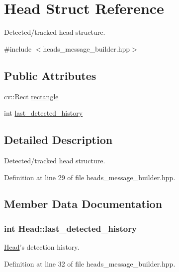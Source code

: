 \hypertarget{struct_head}{\section{\-Head \-Struct \-Reference}
\label{struct_head}
}


\-Detected/tracked head structure.  




{\ttfamily \#include $<$heads\-\_\-message\-\_\-builder.\-hpp$>$}

\subsection*{\-Public \-Attributes}
\begin{DoxyCompactItemize}
\item 
cv\-::\-Rect \hyperlink{struct_head_abab8dfa974c091d1af36c7182e8d1ae2}{rectangle}
\item 
int \hyperlink{struct_head_aa15cb7de63f5d769d5a39356d04f0636}{last\-\_\-detected\-\_\-history}
\end{DoxyCompactItemize}


\subsection{\-Detailed \-Description}
\-Detected/tracked head structure. 

\-Definition at line 29 of file heads\-\_\-message\-\_\-builder.\-hpp.



\subsection{\-Member \-Data \-Documentation}
\hypertarget{struct_head_aa15cb7de63f5d769d5a39356d04f0636}{
\subsubsection[{last\-\_\-detected\-\_\-history}]{\setlength{\rightskip}{0pt plus 5cm}int {\bf \-Head\-::last\-\_\-detected\-\_\-history}}}\label{struct_head_aa15cb7de63f5d769d5a39356d04f0636}
\hyperlink{struct_head}{\-Head}'s detection history. 

\-Definition at line 32 of file heads\-\_\-message\-\_\-builder.\-hpp.

